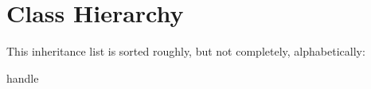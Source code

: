 \section{Class Hierarchy}
This inheritance list is sorted roughly, but not completely, alphabetically\-:\begin{DoxyCompactList}
\item handle\begin{DoxyCompactList}
\item {}
\item {}
\item {}
\item {}
\end{DoxyCompactList}
\end{DoxyCompactList}
